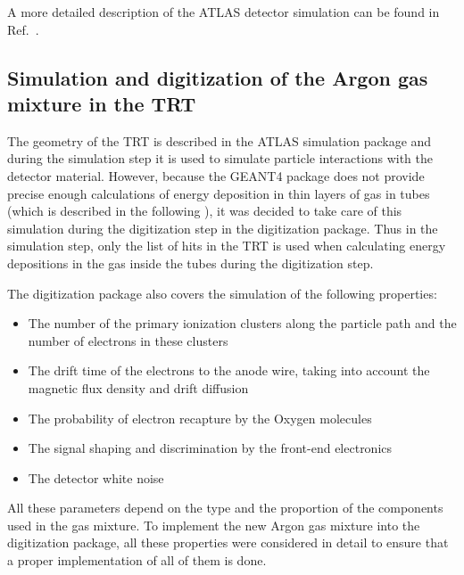 A more detailed description of the ATLAS detector simulation can be found in Ref.~\cite{Aad:2010ah}.

\subsection{Simulation and digitization of the Argon gas mixture in the TRT}
\label{subsec:TRT:argonImpl}


The geometry of the TRT is described in the ATLAS simulation package and during the simulation step it is used to simulate particle interactions with the detector material.
However, because the GEANT4 package does not provide precise enough calculations of energy deposition in thin layers of gas in tubes 
(which is described in the following ), it was decided to take care of this simulation during the digitization step in the digitization package.
Thus in the simulation step, only the list of hits in the TRT is used when calculating energy depositions in the gas inside the tubes during the digitization step.

The digitization package also covers the simulation of the following properties:
\begin{itemize}
 \item The number of the primary ionization clusters along the particle path and the number of electrons in these clusters
 \item The drift time of the electrons to the anode wire, taking into account the magnetic flux density and drift diffusion
 \item The probability of electron recapture by the Oxygen molecules
 \item The signal shaping and discrimination by the front-end electronics
 \item The detector white noise
\end{itemize}

All these parameters depend on the type and the proportion of the components used in the gas mixture. 
To implement the new Argon gas mixture into the digitization package, all these properties were considered in detail 
to ensure that a proper implementation of all of them is done.

